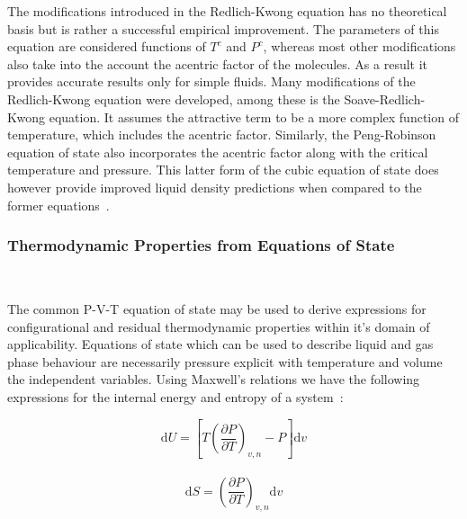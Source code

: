 The modifications introduced in the Redlich-Kwong equation has no theoretical basis but is rather a successful empirical improvement. The parameters of this equation are considered functions of $T^{c}$ and $P^{c}$, whereas most other modifications also take into the account the acentric factor of the molecules. As a result it provides accurate results only for simple fluids. Many modifications of the Redlich-Kwong equation were developed, among these is the Soave-Redlich-Kwong equation. It assumes the attractive term to be a more complex function of temperature, which includes the acentric factor. Similarly, the Peng-Robinson equation of state also incorporates the acentric factor along with the critical temperature and pressure. This latter form of the cubic equation of state does however provide improved liquid density predictions when compared to the former equations~\cite{ThermophysicalProperties, ThermodynamicModels}.\\

\subsubsection{Thermodynamic Properties from Equations of State} \label{EOSPropertiesSection}\

The common P-V-T equation of state may be used to derive expressions for configurational and residual thermodynamic properties within it's domain of applicability. Equations of state which can be used to describe liquid and gas phase behaviour are necessarily pressure explicit with temperature and volume the independent variables. Using Maxwell's relations we have the following expressions for the internal energy and entropy of a system~\cite{MolecularThermodynamicsOfFluidPhaseEquilibria}:\

\begin{equation}
\mathrm{d}U = \left[ T\left(\frac{\partial P }{\partial T}\right)_{v, n} - P\right]\mathrm{d}v \label{InternalEnergyTVMaxwell}
\end{equation}\
\begin{equation}
\mathrm{d}S = \left(\frac{\partial P }{\partial T}\right)_{v, n}\mathrm{d}v \label{EntropyTV}
\end{equation}\

